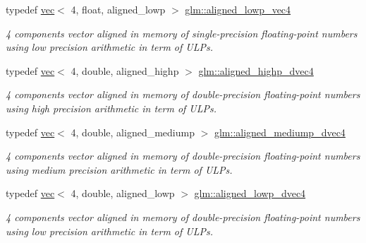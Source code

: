 \begin{DoxyCompactItemize}
\mbox{\label{group__gtc__type__aligned_gaba45497051d04e2aa681653c14fc023c}} 
typedef \hyperlink{structglm_1_1vec}{vec}$<$ 4, float, aligned\+\_\+lowp $>$ \hyperlink{group__gtc__type__aligned_gaba45497051d04e2aa681653c14fc023c}{glm\+::aligned\+\_\+lowp\+\_\+vec4}
\begin{DoxyCompactList}\small\item\em 4 components vector aligned in memory of single-\/precision floating-\/point numbers using low precision arithmetic in term of U\+L\+Ps. \end{DoxyCompactList}\item 
\mbox{\label{group__gtc__type__aligned_ga4b7b03b9178c6f0574c26181a054beec}} 
typedef \hyperlink{structglm_1_1vec}{vec}$<$ 4, double, aligned\+\_\+highp $>$ \hyperlink{group__gtc__type__aligned_ga4b7b03b9178c6f0574c26181a054beec}{glm\+::aligned\+\_\+highp\+\_\+dvec4}
\begin{DoxyCompactList}\small\item\em 4 components vector aligned in memory of double-\/precision floating-\/point numbers using high precision arithmetic in term of U\+L\+Ps. \end{DoxyCompactList}\item 
\mbox{\label{group__gtc__type__aligned_gab825a10044970cfc9b5fbb6cfa58b640}} 
typedef \hyperlink{structglm_1_1vec}{vec}$<$ 4, double, aligned\+\_\+mediump $>$ \hyperlink{group__gtc__type__aligned_gab825a10044970cfc9b5fbb6cfa58b640}{glm\+::aligned\+\_\+mediump\+\_\+dvec4}
\begin{DoxyCompactList}\small\item\em 4 components vector aligned in memory of double-\/precision floating-\/point numbers using medium precision arithmetic in term of U\+L\+Ps. \end{DoxyCompactList}\item 
\mbox{\label{group__gtc__type__aligned_ga0c40d2f75a8bdae67116c4c973252baf}} 
typedef \hyperlink{structglm_1_1vec}{vec}$<$ 4, double, aligned\+\_\+lowp $>$ \hyperlink{group__gtc__type__aligned_ga0c40d2f75a8bdae67116c4c973252baf}{glm\+::aligned\+\_\+lowp\+\_\+dvec4}
\begin{DoxyCompactList}\small\item\em 4 components vector aligned in memory of double-\/precision floating-\/point numbers using low precision arithmetic in term of U\+L\+Ps. \end{DoxyCompactList}\item 

\end{DoxyCompactItemize}
